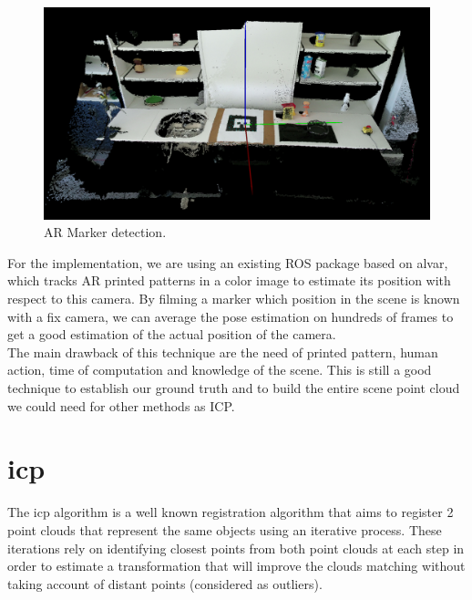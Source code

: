 \begin{figure}[h!]
    \centering
    \includegraphics[width=\textwidth]{images/marker_detection.png}
    \caption{AR Marker detection.}
    \label{fig:ar_marker}
\end{figure}

For the implementation, we are using an existing ROS package based on alvar, which tracks AR printed patterns in a color image to estimate its position with respect to this camera. By filming a marker which position in the scene is known with a fix camera, we can average the pose estimation on hundreds of frames to get a good estimation of the actual position of the camera. \\
The main drawback of this technique are the need of printed pattern, human action, time of computation and knowledge of the scene. This is still a good technique to establish our ground truth and to build the entire scene point cloud we could need for other methods as ICP.


\section{\acrlong{icp}}

The \acrlong{icp} algorithm is a well known registration algorithm that aims to register 2 point clouds that represent the same objects using an iterative process. These iterations rely on identifying closest points from both point clouds at each step in order to estimate a transformation that will improve the clouds matching without taking account of distant points (considered as outliers).\\

